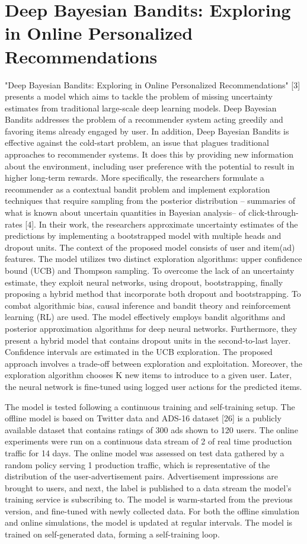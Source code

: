 \section{Deep Bayesian Bandits: Exploring in Online Personalized
Recommendations}
"Deep Bayesian Bandits: Exploring in  Online Personalized Recommendations" [3] presents a model which aims to tackle the problem of missing uncertainty estimates from traditional large-scale deep learning models. Deep Bayesian Bandits addresses the problem of a recommender system acting greedily and favoring items already engaged by user. In addition, Deep Bayesian Bandits is effective against the cold-start problem, an issue that plagues traditional approaches to recommender systems. It does this by providing new information about the environment, including user preference with the potential to result in  higher long-term rewards. More specifically, the researchers formulate a recommender as a contextual bandit problem and implement exploration techniques that require sampling from the posterior distribution -- summaries of what is known about uncertain quantities in Bayesian analysis-- of click-through-rates [4]. In their work, the researchers approximate uncertainty estimates of the predictions by implementing a bootstrapped model with multiple heads and dropout units. The context of the proposed model consists of user and item(ad) features. The model utilizes two distinct exploration algorithms: upper confidence bound (UCB) and Thompson sampling. To overcome the lack of an uncertainty estimate, they exploit neural networks, using dropout, bootstrapping, finally proposing a hybrid method that incorporate both dropout and bootstrapping. 
To combat algorithmic bias, causal inference and bandit theory and reinforcement learning (RL) are used. The model effectively employs bandit algorithms and posterior approximation algorithms for deep neural networks. Furthermore, they present a hybrid model that contains dropout units in the second-to-last layer. Confidence intervals are estimated in the UCB exploration. 
The proposed approach involves a trade-off between exploration and exploitation. Moreover, the exploration algorithm chooses K new items to introduce to a given user. Later, the neural network is fine-tuned using logged user actions for the predicted items. 

The model is tested following a continuous training and self-training setup. The offline model is based on Twitter data and ADS-16 dataset [26] is a publicly available dataset
that contains ratings of 300 ads shown to 120 users. The online experiments were run on a continuous data stream of 2\text{\%} of real time production traffic for 14 days. The online model was assessed on test data gathered by a random policy serving 1\text{\%} production traffic, which is representative of the distribution of the user-advertisement pairs.  Advertisement impressions are brought to users, and next, the label is published to a data stream the model’s training service is subscribing to. The model is warm-started from the previous version, and fine-tuned with newly collected data. For both the offline simulation and online simulations, the model is updated at regular intervals. The model is trained on self-generated data, forming a self-training loop.

